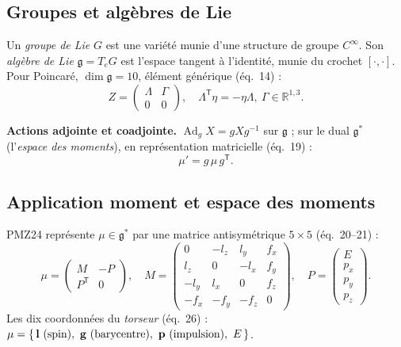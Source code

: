 \documentclass[11pt,a4paper]{article}
\theoremstyle{definition}
\theoremstyle{plain}
\newcommand{\eqpaper}[1]{\textsf{(éq.~#1)}}   %
\DeclareMathOperator{\Ad}{Ad}
\begin{document}
\subsection{Groupes et algèbres de Lie}

Un \emph{groupe de Lie} $G$ est une variété munie d'une structure de groupe $C^\infty$. Son
\emph{algèbre de Lie} $\mathfrak g=T_eG$ est l'espace tangent à l'identité, munie du crochet
$[\cdot,\cdot]$. Pour Poincaré, $\dim\mathfrak g=10$, élément générique \eqpaper{14} :
\begin{equation}
Z=\begin{pmatrix}\Lambda & \Gamma\\ 0 & 0\end{pmatrix},\quad
\Lambda^{\mathsf T}\eta=-\eta\Lambda,\ \Gamma\in\mathbb R^{1,3}.
\end{equation}

\textbf{Actions adjointe et coadjointe.} $\Ad_g X=gXg^{-1}$ sur $\mathfrak g$ ; sur le dual
$\mathfrak g^\ast$ (l'\emph{espace des moments}), en représentation matricielle \eqpaper{19} :
\begin{equation}
\mu'=g\,\mu\,g^{\mathsf T}.
\label{eq:coadj}
\end{equation}

\subsection{Application moment et espace des moments}

PMZ24 représente $\mu\in\mathfrak g^\ast$ par une matrice antisymétrique $5\times5$
\eqpaper{20--21} :
\begin{equation}
\mu=\begin{pmatrix} M & -P\\ P^{\mathsf T} & 0\end{pmatrix},\quad
M=\begin{pmatrix}
0 & -l_z & l_y & f_x\\
l_z & 0 & -l_x & f_y\\
-l_y & l_x & 0 & f_z\\
-f_x & -f_y & -f_z & 0
\end{pmatrix},\quad
P=\begin{pmatrix}E\\ p_x\\ p_y\\ p_z\end{pmatrix}.
\end{equation}
Les dix coordonnées du \emph{torseur} \eqpaper{26} :
$\mu=\{\,\vb l\ (\text{spin}),\ \vb g\ (\text{barycentre}),\ \vb p\ (\text{impulsion}),\ E\,\}$.
\end{document}
